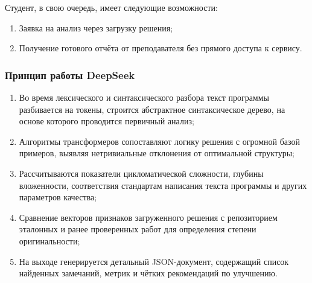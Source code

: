 Студент, в свою очередь, имеет следующие возможности:

\begin{enumerate}
    \item Заявка на анализ через загрузку решения;
    \item Получение готового отчёта от преподавателя без прямого доступа к сервису.
\end{enumerate}

\subsubsection{Принцип работы DeepSeek}

\begin{enumerate}
  \item Во время лексического и синтаксического разбора текст программы разбивается на токены, строится абстрактное синтаксическое дерево, на основе которого проводится первичный анализ;
  \item Алгоритмы трансформеров сопоставляют логику решения с огромной базой примеров, выявляя нетривиальные отклонения от оптимальной структуры;
  \item Рассчитываются показатели цикломатической сложности, глубины вложенности, соответствия стандартам написания текста программы и других параметров качества;
  \item Сравнение векторов признаков загруженного решения с репозиторием эталонных и ранее проверенных работ для определения степени оригинальности;
  \item На выходе генерируется детальный JSON-документ, содержащий список найденных замечаний, метрик и чётких рекомендаций по улучшению.
\end{enumerate}
